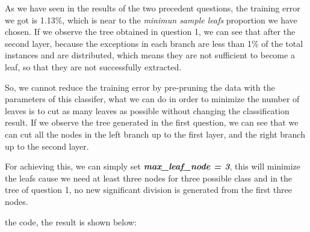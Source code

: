 \documentclass[11pt]{article}
\begin{document}
    As we have seen in the results of the two precedent questions, the
training error we got is 1.13\%, which is near to the \emph{minimun
sample leafs} proportion we have chosen. If we observe the tree obtained
in question 1, we can see that after the second layer, because the
exceptions in each branch are less than 1\% of the total instances and
are distributed, which means they are not sufficient to become a leaf,
so that they are not successfully extracted.

So, we cannot reduce the training error by pre-pruning the data with the
parameters of this classifer, what we can do in order to minimize the
number of leaves is to cut as many leaves as possible without changing
the classification result. If we observe the tree generated in the first
question, we can see that we can cut all the nodes in the left branch up
to the first layer, and the right branch up to the second layer.

For achieving this, we can simply set \textbf{\emph{max\_leaf\_node =
3}}, this will minimize the leafs cause we need at least three nodes for
three possible class and in the tree of question 1, no new significant
division is generated from the first three nodes.

the code, the result is shown below:
\end{document}
